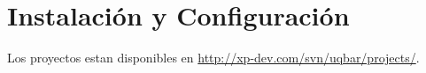 \section{Instalación y Configuración}
\label{instalation}
Los proyectos estan disponibles en \url{http://xp-dev.com/svn/uqbar/projects/}.


